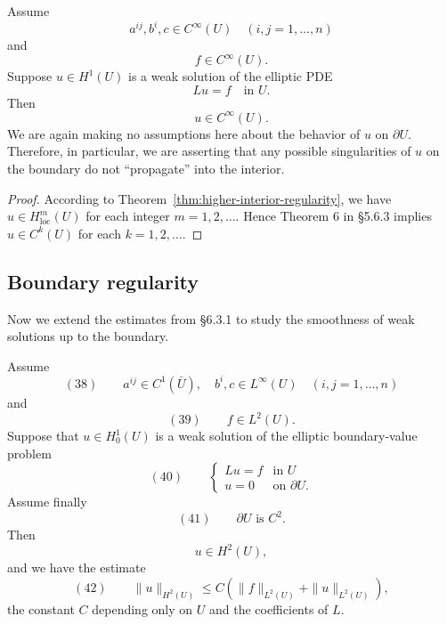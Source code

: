 \begin{theorem}
\label{thm:interior-infinite-differentiability}
Assume
$$a^{ij}, b^i, c \in C^\infty(U) \quad (i,j=1,\ldots,n)$$
and
$$f \in C^\infty(U).$$
Suppose $u \in H^1(U)$ is a weak solution of the elliptic PDE
$$Lu = f \quad \text{in } U.$$
Then
$$u \in C^\infty(U).$$
We are again making no assumptions here about the behavior of $u$ on $\partial U$. Therefore, in particular, we are asserting that any possible singularities of $u$ on the boundary do not ``propagate'' into the interior.
\end{theorem}

\begin{proof}
According to Theorem~\ref{thm:higher-interior-regularity}, we have $u \in H^m_{\text{loc}}(U)$ for each integer $m = 1,2,\ldots$. Hence Theorem 6 in \S5.6.3 implies $u \in C^k(U)$ for each $k = 1,2,\ldots$.
\end{proof}

\subsection{Boundary regularity}

Now we extend the estimates from \S6.3.1 to study the smoothness of weak solutions up to the boundary.

\begin{theorem}
\label{thm:boundary-h2-regularity}
Assume
$$(38) \qquad a^{ij} \in C^1(\bar U), \quad b^i,c \in L^\infty(U) \quad (i,j=1,\ldots,n)$$
and
$$(39) \qquad f \in L^2(U).$$
Suppose that $u \in H_0^1(U)$ is a weak solution of the elliptic boundary-value problem
$$(40) \qquad \begin{cases} Lu = f & \text{in } U \\ u = 0 & \text{on } \partial U. \end{cases}$$
Assume finally
$$(41) \qquad \partial U \text{ is } C^2.$$
Then
$$u \in H^2(U),$$
and we have the estimate
$$(42) \qquad \|u\|_{H^2(U)} \leq C(\|f\|_{L^2(U)}+\|u\|_{L^2(U)}),$$
the constant $C$ depending only on $U$ and the coefficients of $L$.
\end{theorem}

